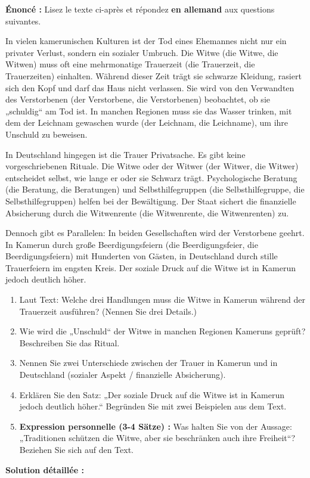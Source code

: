 \documentclass[11pt]{article}
\begin{document}
\begin{exoresolu}
\textbf{Énoncé :} Lisez le texte ci-après et répondez \textbf{en allemand} aux questions suivantes.
\begin{textebox}
In vielen kamerunischen Kulturen ist der Tod eines Ehemannes nicht nur ein privater Verlust, sondern ein sozialer Umbruch. Die Witwe (die Witwe, die Witwen) muss oft eine mehrmonatige Trauerzeit (die Trauerzeit, die Trauerzeiten) einhalten. Während dieser Zeit trägt sie schwarze Kleidung, rasiert sich den Kopf und darf das Haus nicht verlassen. Sie wird von den Verwandten des Verstorbenen (der Verstorbene, die Verstorbenen) beobachtet, ob sie „schuldig“ am Tod ist. In manchen Regionen muss sie das Wasser trinken, mit dem der Leichnam gewaschen wurde (der Leichnam, die Leichname), um ihre Unschuld zu beweisen.

In Deutschland hingegen ist die Trauer Privatsache. Es gibt keine vorgeschriebenen Rituale. Die Witwe oder der Witwer (der Witwer, die Witwer) entscheidet selbst, wie lange er oder sie Schwarz trägt. Psychologische Beratung (die Beratung, die Beratungen) und Selbsthilfegruppen (die Selbsthilfegruppe, die Selbsthilfegruppen) helfen bei der Bewältigung. Der Staat sichert die finanzielle Absicherung durch die Witwenrente (die Witwenrente, die Witwenrenten) zu.

Dennoch gibt es Parallelen: In beiden Gesellschaften wird der Verstorbene geehrt. In Kamerun durch große Beerdigungsfeiern (die Beerdigungsfeier, die Beerdigungsfeiern) mit Hunderten von Gästen, in Deutschland durch stille Trauerfeiern im engsten Kreis. Der soziale Druck auf die Witwe ist in Kamerun jedoch deutlich höher.
\end{textebox}

\begin{enumerate}
    \item Laut Text: Welche drei Handlungen muss die Witwe in Kamerun während der Trauerzeit ausführen? (Nennen Sie drei Details.)
    \item Wie wird die „Unschuld“ der Witwe in manchen Regionen Kameruns geprüft? Beschreiben Sie das Ritual.
    \item Nennen Sie zwei Unterschiede zwischen der Trauer in Kamerun und in Deutschland (sozialer Aspekt / finanzielle Absicherung).
    \item Erklären Sie den Satz: „Der soziale Druck auf die Witwe ist in Kamerun jedoch deutlich höher.“ Begründen Sie mit zwei Beispielen aus dem Text.
    \item \textbf{Expression personnelle (3-4 Sätze) :} Was halten Sie von der Aussage: „Traditionen schützen die Witwe, aber sie beschränken auch ihre Freiheit“? Beziehen Sie sich auf den Text.
\end{enumerate}
\tcblower
\textbf{Solution détaillée :}


\end{exoresolu}
\end{document}
